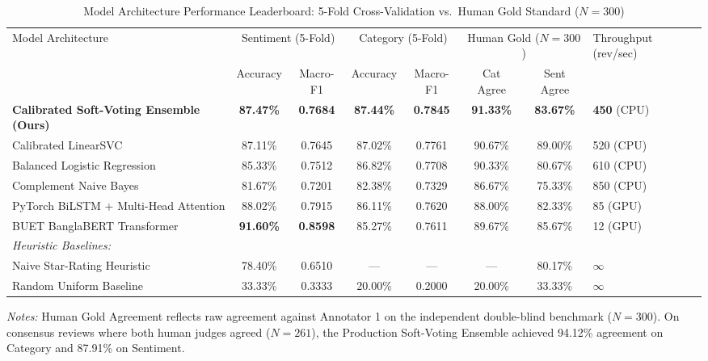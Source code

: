 \documentclass[review,12pt,authoryear]{elsarticle}
\begin{document}
\begin{table}[t]
\centering
\caption{Model Architecture Performance Leaderboard: 5-Fold Cross-Validation vs.\ Human Gold Standard ($N=300$)}
\label{tab:model_leaderboard}
\footnotesize
\setlength{\tabcolsep}{4pt}
\begin{tabularx}{\textwidth}{@{}lccccccX@{}}
\toprule
\multirow{2}{*}{Model Architecture} & \multicolumn{2}{c}{Sentiment (5-Fold)} & \multicolumn{2}{c}{Category (5-Fold)} & \multicolumn{2}{c}{Human Gold ($N=300$)} & \multirow{2}{=}{Throughput (rev/sec)} \\
\cmidrule(lr){2-3} \cmidrule(lr){4-5} \cmidrule(lr){6-7}
& Accuracy & Macro-F1 & Accuracy & Macro-F1 & Cat Agree & Sent Agree & \\
\midrule
\textbf{Calibrated Soft-Voting Ensemble (Ours)} & \textbf{87.47\%} & \textbf{0.7684} & \textbf{87.44\%} & \textbf{0.7845} & \textbf{91.33\%} & \textbf{83.67\%} & \textbf{450} (CPU) \\
Calibrated LinearSVC & 87.11\% & 0.7645 & 87.02\% & 0.7761 & 90.67\% & 89.00\% & 520 (CPU) \\
Balanced Logistic Regression & 85.33\% & 0.7512 & 86.82\% & 0.7708 & 90.33\% & 80.67\% & 610 (CPU) \\
Complement Naive Bayes & 81.67\% & 0.7201 & 82.38\% & 0.7329 & 86.67\% & 75.33\% & 850 (CPU) \\
PyTorch BiLSTM + Multi-Head Attention & 88.02\% & 0.7915 & 86.11\% & 0.7620 & 88.00\% & 82.33\% & 85 (GPU) \\
BUET BanglaBERT Transformer & \textbf{91.60\%} & \textbf{0.8598} & 85.27\% & 0.7611 & 89.67\% & 85.67\% & 12 (GPU) \\
\addlinespace
\textit{Heuristic Baselines:} & & & & & & & \\
Naive Star-Rating Heuristic & 78.40\% & 0.6510 & --- & --- & --- & 80.17\% & $\infty$ \\
Random Uniform Baseline & 33.33\% & 0.3333 & 20.00\% & 0.2000 & 20.00\% & 33.33\% & $\infty$ \\
\bottomrule
\end{tabularx}
\vspace{0.4em}
\parbox{\textwidth}{\footnotesize \textit{Notes:} Human Gold Agreement reflects raw agreement against Annotator 1 on the independent double-blind benchmark ($N = 300$). On consensus reviews where both human judges agreed ($N = 261$), the Production Soft-Voting Ensemble achieved 94.12\% agreement on Category and 87.91\% on Sentiment.}
\end{table}
\end{document}
